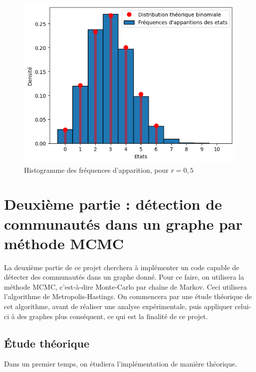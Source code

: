 \documentclass[a4paper, 11pt]{article}
\begin{document}
\begin{figure}[h!]
    \centering
    \includegraphics[scale=0.8]{hist_r_05.png}
    \caption{Histogramme des fréquences d'apparition, pour $r=0,5$}
    \label{fig:hist2}
\end{figure}
\newpage
\section{Deuxième partie : détection de communautés dans un graphe par méthode MCMC}
La deuxième partie de ce projet cherchera à implémenter un code capable de détecter des communautés dans un graphe donné. Pour ce faire, on utilisera la méthode MCMC, c'est-à-dire Monte-Carlo par chaîne de Markov. Ceci utilisera l'algorithme de Metropolis-Hastings. On commencera par une étude théorique de cet algorithme, avant de réaliser une analyse expérimentale, puis appliquer celui-ci à des graphes plus conséquent, ce qui est la finalité de ce projet.
\subsection{Étude théorique}
Dans un premier temps, on étudiera l'implémentation de manière théorique.
\end{document}
